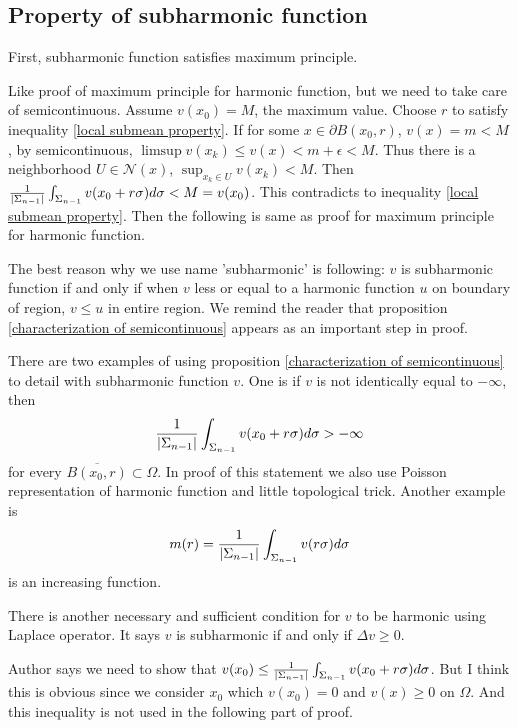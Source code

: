 \subsection{Property of subharmonic function}
First, subharmonic function satisfies maximum principle.
\begin{remark}
    Like proof of maximum principle for harmonic function, but we need
    to take care of semicontinuous. Assume $v(x_0)=M$, the maximum value. Choose $r$ to satisfy inequality \eqref{local submean property}.
    If for some $x\in \partial B(x_0,r)$, $v(x)=m<M$, by semicontinuous, $\limsup{v(x_k)}\leq v(x)<m+\epsilon<M$. Thus there is a
    neighborhood $U\in\mathscr{N}(x)$, $\sup_{x_k\in U}{v(x_k)}<M$. Then $\frac{1}{\left\lvert\Sigma_{n-1}\right\rvert}\int_{\Sigma_{n-1}}{v(x_0+r\sigma) d\sigma}<M=v(x_0)$.
    This contradicts to inequality \eqref{local submean property}. Then the following is same as proof for maximum principle for harmonic function.
\end{remark}
The best reason why we use name 'subharmonic' is following: $v$ is subharmonic function if and only if when $v$ less or equal to a harmonic function $u$
on boundary of region, $v\leq u$ in entire region. We remind the reader that proposition \ref{characterization of semicontinuous} appears as an important
step in proof.\par
There are two examples of using proposition \ref{characterization of semicontinuous} to detail with subharmonic function $v$. One is if $v$
is not identically equal to $-\infty$, then
\begin{equation*}
    \frac{1}{\left\lvert\Sigma_{n-1}\right\rvert}\int_{\Sigma_{n-1}}{v(x_0+r\sigma) d\sigma}>-\infty
\end{equation*}
for every $\overline{B(x_0,r)}\subset\Omega$.
In proof of this statement we also use Poisson representation of harmonic function and little topological trick. Another example
is
\begin{equation}\label{equation m(r)}
    m(r)=\frac{1}{\left\lvert\Sigma_{n-1}\right\rvert}\int_{\Sigma_{n-1}}{v(r\sigma) d\sigma}
\end{equation}
is an increasing function.\par
There is another necessary and sufficient condition for $v$ to be harmonic using Laplace operator. It says $v$ is subharmonic if and
only if $\Delta v\geq 0$.
\begin{remark}
    {\color{blue}Author says we need to show that $v(x_0)\leq\frac{1}{\left\lvert\Sigma_{n-1}\right\rvert}\int_{\Sigma_{n-1}}{v(x_0+r\sigma) d\sigma}$. But I
        think this is obvious since we consider $x_0$ which $v(x_0)=0$ and $v(x)\geq 0$ on $\Omega$. And this inequality is not used in the following part of proof}.
\end{remark}

